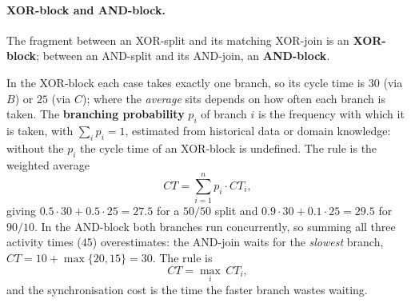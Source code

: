 \paragraph{XOR-block and AND-block.} The fragment between an XOR-split and its matching XOR-join is an \textbf{XOR-block}; between an AND-split and its AND-join, an \textbf{AND-block}.
\begin{center}
\hspace{0.8cm}
\end{center}
In the XOR-block each case takes exactly one branch, so its cycle time is $30$ (via $B$) or $25$ (via $C$); where the \emph{average} sits depends on how often each branch is taken. The \textbf{branching probability} $p_i$ of branch $i$ is the frequency with which it is taken, with $\sum_i p_i = 1$, estimated from historical data or domain knowledge: without the $p_i$ the cycle time of an XOR-block is undefined. The rule is the weighted average
\[CT = \sum_{i=1}^{n} p_i \cdot CT_i,\]
giving $0.5 \cdot 30 + 0.5 \cdot 25 = 27.5$ for a $50/50$ split and $0.9 \cdot 30 + 0.1 \cdot 25 = 29.5$ for $90/10$. In the AND-block both branches run concurrently, so summing all three activity times ($45$) overestimates: the AND-join waits for the \emph{slowest} branch, $CT = 10 + \max\{20, 15\} = 30$. The rule is
\[CT = \max_i\, CT_i,\]
and the synchronisation cost is the time the faster branch wastes waiting.

